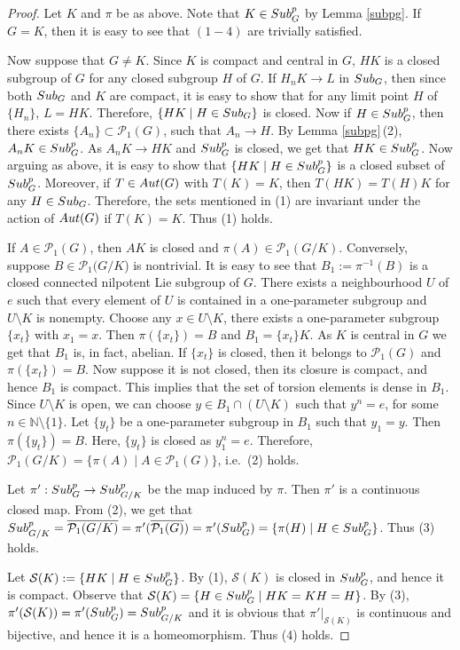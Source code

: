 \documentclass{amsart}
\numberwithin{equation}{section}
\newcommand{\Aut}{{\rm Aut}}
\newcommand{\Sub}{{\rm Sub}}
\newcommand{\N}{{\mathbb N}}
\newcommand{\cS}{{\mathcal S}}
\newcommand{\spg}{{\rm Sub}^p_G}
\newcommand{\spp}{{\rm Sub}^{p}}
\let\ol=\overline
\let\mi=\setminus
\theoremstyle{remark}
\newcommand{\cP}{{\mathcal{P}}}
\begin{document}
\begin{proof} Let $K$ and $\pi$ be as above. Note that $K\in\spg$ by Lemma \ref{subpg}. If $G=K$, then it is easy to see that 
$(1-4)$ are trivially satisfied. 

Now suppose that $G\ne K$. Since $K$ is compact and central in $G$, $HK$ is a closed subgroup of $G$ for any 
closed subgroup $H$ of $G$. If $H_nK\to L$ in $\Sub_G$, then since both $\Sub_G$ and $K$ are compact, it is easy to show that 
for any limit point $H$ of $\{H_n\}$, $L=HK$. Therefore, $\{HK\mid H\in\Sub_G\}$ is closed. Now if $H\in\spg$, then there exists 
$\{A_n\}\subset\cP_1(G)$, such that $A_n\to H$. By Lemma \ref{subpg}\,(2), $A_nK\in\spg$. As $A_nK\to HK$ and $\spg$ is closed, 
we get that $HK\in\spg$. Now arguing as above, it is easy to show that $\{HK\mid H\in\spg\}$ is a closed subset of $\spg$. 
Moreover, if $T\in\Aut(G)$ with $T(K)=K$, then $T(HK)=T(H)K$ for any $H\in \Sub_G$. Therefore, the sets mentioned 
in (1) are invariant under the action of $\Aut(G)$ if $T(K)=K$. Thus (1) holds. 


If $A\in\cP_1(G)$, then $AK$ is closed and $\pi(A)\in\cP_1(G/K)$. Conversely, suppose $B\in \cP_1(G/K$) is nontrivial. 
It is easy to see that $B_1:=\pi^{-1}(B)$ is a closed connected nilpotent Lie subgroup of $G$. There exists 
a neighbourhood $U$ of $e$ such that  every element of  $U$ is contained in a one-parameter subgroup and $U\mi K$ 
is nonempty. Choose any $x\in U\mi K$, there exists a one-parameter subgroup $\{x_t\}$ with $x_1=x$. Then 
$\pi(\{x_t\})=B$ and $B_1=\{x_t\}K$. As $K$ is central in $G$ we get that $B_1$ is, in fact, abelian. If $\{x_t\}$ is closed, 
then it belongs to $\cP_1(G)$ and $\pi(\{x_t\})=B$. Now suppose it is not closed, then its closure is compact, and hence 
$B_1$ is compact. This implies that the set of torsion elements is dense in $B_1$. Since $U\mi K$ is open, we can choose 
 $y\in B_1\cap(U\mi K)$ such that $y^n=e$, for some $n\in\N\mi\{1\}$. Let $\{y_t\}$ be a one-parameter subgroup in $B_1$ 
 such that $y_1=y$. Then $\pi(\{y_t\})=B$. Here, $\{y_t\}$ is closed as $y_1^n=e$. Therefore,  
 $\cP_1(G/K)=\{\pi(A)\mid A\in\cP_1(G)\}$, i.e.\ (2) holds. 

Let $\pi':\spg\to \spp_{G/K}$ be the map induced by $\pi$.  
Then $\pi'$ is a continuous closed map. From (2), we get that $\spp_{G/K}=
\ol{\cP_1(G/K)}=\pi'(\ol{\cP_1(G)})=\pi'(\spg)=\{\pi(H)\mid H\in\spg\}$. Thus (3) holds. 

Let $\cS(K):=\{HK\mid H\in\spg\}$. By (1), $\cS(K)$ is closed in $\spg$, and hence it is compact. 
Observe that $\cS(K)=\{H\in\spg\mid HK=KH=H\}$. By (3), $\pi'(\cS(K))=\pi'(\spg)=\spp_{G/K}$ and it is 
obvious that $\pi'|_{\cS(K)}$ is continuous and bijective, and hence it is a homeomorphism. Thus (4) holds. 
\end{proof}
\end{document}
